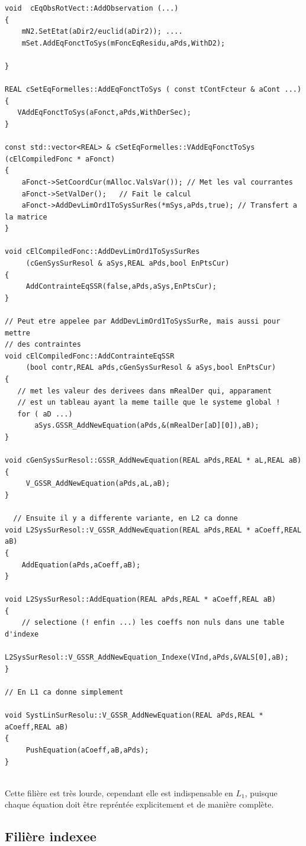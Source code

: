 {\small
\begin{verbatim}
void  cEqObsRotVect::AddObservation (...)
{
    mN2.SetEtat(aDir2/euclid(aDir2)); ....
    mSet.AddEqFonctToSys(mFoncEqResidu,aPds,WithD2);

}

REAL cSetEqFormelles::AddEqFonctToSys ( const tContFcteur & aCont ...)
{
   VAddEqFonctToSys(aFonct,aPds,WithDerSec);
}

const std::vector<REAL> & cSetEqFormelles::VAddEqFonctToSys (cElCompiledFonc * aFonct)
{
    aFonct->SetCoordCur(mAlloc.ValsVar()); // Met les val courrantes
    aFonct->SetValDer();   // Fait le calcul
    aFonct->AddDevLimOrd1ToSysSurRes(*mSys,aPds,true); // Transfert a la matrice
}

void cElCompiledFonc::AddDevLimOrd1ToSysSurRes
     (cGenSysSurResol & aSys,REAL aPds,bool EnPtsCur)
{
     AddContrainteEqSSR(false,aPds,aSys,EnPtsCur);
}

// Peut etre appelee par AddDevLimOrd1ToSysSurRe, mais aussi pour mettre
// des contraintes
void cElCompiledFonc::AddContrainteEqSSR
     (bool contr,REAL aPds,cGenSysSurResol & aSys,bool EnPtsCur)
{
   // met les valeur des derivees dans mRealDer qui, apparament 
   // est un tableau ayant la meme taille que le systeme global !
   for ( aD ...)
       aSys.GSSR_AddNewEquation(aPds,&(mRealDer[aD][0]),aB);
}

void cGenSysSurResol::GSSR_AddNewEquation(REAL aPds,REAL * aL,REAL aB)
{
     V_GSSR_AddNewEquation(aPds,aL,aB);
}

  // Ensuite il y a differente variante, en L2 ca donne
void L2SysSurResol::V_GSSR_AddNewEquation(REAL aPds,REAL * aCoeff,REAL aB)
{
    AddEquation(aPds,aCoeff,aB);
}

void L2SysSurResol::AddEquation(REAL aPds,REAL * aCoeff,REAL aB)
{
    // selectione (! enfin ...) les coeffs non nuls dans une table d'indexe
    L2SysSurResol::V_GSSR_AddNewEquation_Indexe(VInd,aPds,&VALS[0],aB);
}

// En L1 ca donne simplement 

void SystLinSurResolu::V_GSSR_AddNewEquation(REAL aPds,REAL * aCoeff,REAL aB)
{
     PushEquation(aCoeff,aB,aPds);
}


\end{verbatim}
}


Cette fili\`ere est tr\`es lourde, cependant elle est indispensable en $L_1$, puisque
chaque \'equation doit \^etre repr\'ent\'ee explicitement et de mani\`ere compl\`ete.


\subsection {Fili\`ere indexee}

